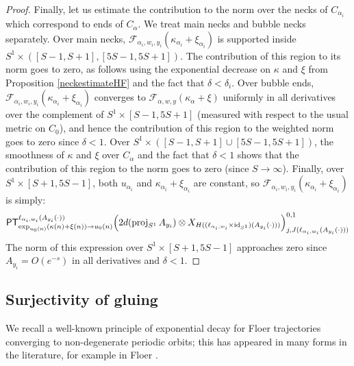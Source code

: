 \documentclass[12pt]{article}
\theoremstyle{definition}
\theoremstyle{remark}
\numberwithin{equation}{subsection}
\newcommand{\F}{\mathcal F}
\newcommand{\PT}{\mathsf{PT}}
\newcommand{\proj}{\operatorname{proj}}
\newcommand{\id}{\operatorname{id}}
\begin{document}
\begin{proof}
Finally, let us estimate the contribution to the norm over the necks of $C_{\alpha_i}$ which correspond to ends of $C_\alpha$.  We treat main necks and bubble necks separately.  Over main necks, $\F_{\alpha_i,w_i,y_i}(\kappa_{\alpha_i}+\xi_{\alpha_i})$ is supported inside $S^1\times([S-1,S+1],[5S-1,5S+1])$.  The contribution of this region to its norm goes to zero, as follows using the exponential decrease on $\kappa$ and $\xi$ from Proposition \ref{neckestimateHF} and the fact that $\delta<\delta_i$.  Over bubble ends, $\F_{\alpha_i,w_i,y_i}(\kappa_{\alpha_i}+\xi_{\alpha_i})$ converges to $\F_{\alpha,w,y}(\kappa_\alpha+\xi)$ uniformly in all derivatives over the complement of $S^1\times[S-1,5S+1]$ (measured with respect to the usual metric on $C_0$), and hence the contribution of this region to the weighted norm goes to zero since $\delta<1$.  Over $S^1\times([S-1,S+1]\cup[5S-1,5S+1])$, the smoothness of $\kappa$ and $\xi$ over $C_\alpha$ and the fact that $\delta<1$ shows that the contribution of this region to the norm goes to zero (since $S\to\infty$).  Finally, over $S^1\times[S+1,5S-1]$, both $u_{\alpha_i}$ and $\kappa_{\alpha_i}+\xi_{\alpha_i}$ are constant, so $\F_{\alpha_i,w_i,y_i}(\kappa_{\alpha_i}+\xi_{\alpha_i})$ is simply:
\begin{equation*}
\PT_{\exp_{u_0(n)}(\kappa(n)+\xi(n))\to u_0(n)}^{\ell_{\alpha_i,w_i}(A_{y_i}(\cdot))}\Bigl(2d(\proj_{S^1}A_{y_i})\otimes X_{H((\ell_{\alpha_i,w_i}\times\id_{S^1})(A_{y_i}(\cdot)))}\Bigr)^{0,1}_{j,J(\ell_{\alpha_i,w_i}(A_{y_i}(\cdot)))}
\end{equation*}
The norm of this expression over $S^1\times[S+1,5S-1]$ approaches zero since $A_{y_i}=O(e^{-s})$ in all derivatives and $\delta<1$.
\end{proof}

\subsection{Surjectivity of gluing}

We recall a well-known principle of exponential decay for Floer trajectories converging to non-degenerate periodic orbits; this has appeared in many forms in the literature, for example in Floer \cite[pp801--802]{floer88}.
\end{document}
